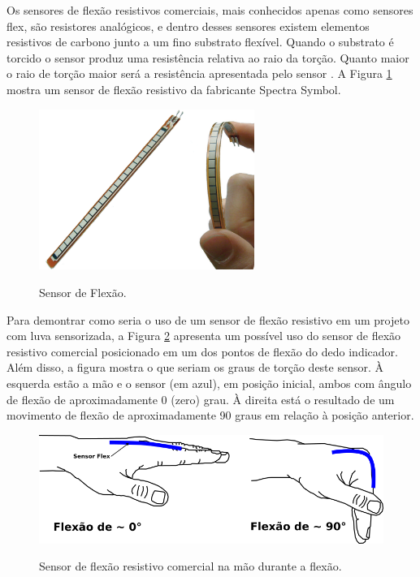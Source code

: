 \documentclass[
	12pt,				%
	openright,			%
	oneside,			%
	a4paper,			%
	english,			%
	brazil				%
	]{abntex2}
\begin{document}
		Os sensores de flexão resistivos comerciais, mais conhecidos apenas como sensores flex, são resistores analógicos, e dentro desses sensores existem elementos resistivos de carbono junto a um fino substrato flexível. Quando o substrato é torcido o sensor produz uma resistência relativa ao raio da torção. Quanto maior o raio de torção maior será a resistência apresentada pelo sensor \cite{solanki2013sign}. A Figura \ref{Fig:flex-sensor1} mostra um sensor de flexão resistivo da fabricante Spectra Symbol.

	\begin{figure}[!h]
		\centering
		\caption{Sensor de Flexão.}
		\includegraphics[width=7cm,keepaspectratio=true]{./figures/flex-sensor1.png}
		\label{Fig:flex-sensor1}
	\end{figure}


		Para demontrar como seria o uso de um sensor de flexão resistivo em um projeto com luva sensorizada, a Figura \ref{Fig:hand-flexsensor-degrees1} apresenta um possível uso do sensor de flexão resistivo comercial posicionado em um dos pontos de flexão do dedo indicador. Além disso, a figura mostra o que seriam os graus de torção deste sensor. À esquerda estão a mão e o sensor (em azul), em posição inicial, ambos com ângulo de flexão de aproximadamente 0 (zero) grau. À direita está o resultado de um movimento de flexão de aproximadamente 90 graus em relação à posição anterior.


	\begin{figure}[!h]
		\centering
		\caption{Sensor de flexão resistivo comercial na mão durante a flexão.}
		\includegraphics[width=13cm,keepaspectratio=true]{./figures/hand-flexsensor-degrees1.png}
		\label{Fig:hand-flexsensor-degrees1}
	\end{figure}
\end{document}
